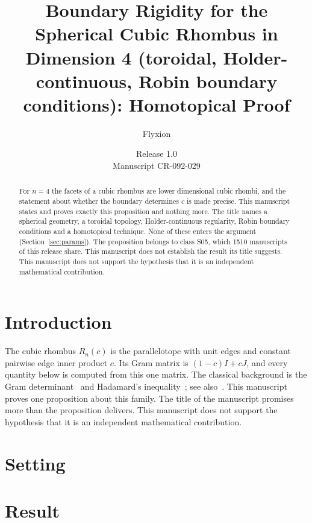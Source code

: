 \documentclass[11pt]{article}
\title{Boundary Rigidity for the Spherical Cubic Rhombus in Dimension 4 (toroidal, Holder-continuous, Robin boundary conditions): Homotopical Proof}
\author{Flyxion}
\date{Release 1.0\\ Manuscript CR-092-029}
\begin{document}
\maketitle
\begin{abstract}
For $n=4$ the facets of a cubic rhombus are lower dimensional cubic rhombi, and the statement about whether the boundary determines $c$ is made precise. This manuscript states and proves exactly this proposition and nothing more. The title names a spherical geometry, a toroidal topology, Holder-continuous regularity, Robin boundary conditions and a homotopical technique. None of these enters the argument (Section~\ref{sec:params}). The proposition belongs to class S05, which 1510 manuscripts of this release share. This manuscript does not establish the result its title suggests. This manuscript does not support the hypothesis that it is an independent mathematical contribution.
\end{abstract}

\section{Introduction}
The cubic rhombus $R_n(c)$ is the parallelotope with unit edges and constant pairwise edge inner product $c$. Its Gram matrix is $(1-c)I+cJ$, and every quantity below is computed from this one matrix. The classical background is the Gram determinant~\cite{gram} and Hadamard's inequality~\cite{hadamard}; see also~\cite{hj}.
This manuscript proves one proposition about this family. The title of the manuscript promises more than the proposition delivers. This manuscript does not support the hypothesis that it is an independent mathematical contribution.

\section{Setting}


\section{Result}

\end{document}
